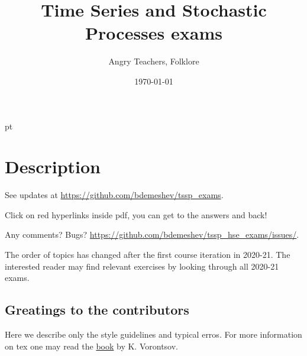 \documentclass[11pt, a4paper]{article}
\title{Time Series and Stochastic Processes exams}
\date{\today}
\author{Angry Teachers, Folklore}
\theoremstyle{definition}
\begin{document}
\maketitle

\tableofcontents{}


 pt %

\clearpage
\section*{Description}

See updates at \url{https://github.com/bdemeshev/tssp_exams}.

Click on red hyperlinks inside pdf, you can get to the answers and back!


Any comments? Bugs?
\url{https://github.com/bdemeshev/tssp_hse_exams/issues/}.

The order of topics has changed after the first course iteration in 2020-21.
The interested reader may find relevant exercises by looking through all 2020-21 exams. 


\subsection*{Greatings to the contributors}

Here we describe only the style guidelines and typical erros. 
For more information on tex one may read the 
\href{http://www.ccas.ru/voron/download/voron05latex.pdf}{book} by K. Vorontsov.
\end{document}
